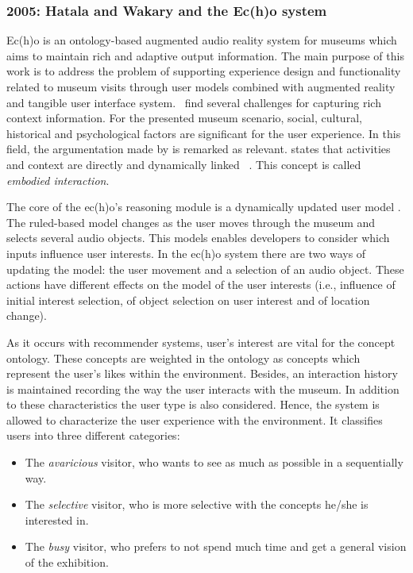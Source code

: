 \subsubsection{2005: Hatala and Wakary and the Ec(h)o system}
\label{sec:hatala}

Ec(h)o is an ontology-based augmented audio reality system for museums which 
aims to maintain rich and adaptive output information. The main purpose of this 
work is to address the problem of supporting experience design and functionality 
related to museum visits through user models combined with augmented reality 
and tangible user interface system.~\citet{hatala_ontology_based_2005} find
several challenges for capturing rich context information. For the presented 
museum scenario, social, cultural, historical and psychological factors are 
significant for the user experience. In this field, the argumentation made by
is remarked as relevant. \citeauthor{dourish_what_2004} states that activities 
and context are directly and dynamically linked \citet{dourish_what_2004}~\citep{dourish_where_2004}.
This concept is called \textit{embodied interaction}.

The core of the ec(h)o's reasoning module is a dynamically updated user model
\citep{wahlster1989user}. The ruled-based model changes as the user moves 
through the museum and selects several audio objects. This models enables 
developers to consider which inputs influence user interests. In the ec(h)o 
system there are two ways of updating the model: the user movement and a 
selection of an audio object. These actions have different effects on the model 
of the user interests (i.e., influence of initial interest selection, of object 
selection on user interest and of location change). 

As it occurs with recommender systems, user's interest are vital for the concept
ontology. These concepts are weighted in the ontology as concepts which represent
the user's likes within the environment. Besides, an interaction history is 
maintained recording the way the user interacts with the museum. In addition to 
these characteristics the user type is also considered. Hence, the system is 
allowed to characterize the user experience with the environment. It classifies 
users into three different categories:

\begin{itemize}
  \item The \textit{avaricious} visitor, who wants to see as much as possible
  in a sequentially way.
  \item The \textit{selective} visitor, who is more selective with the concepts 
  he/she is interested in.
  \item The \textit{busy} visitor, who prefers to not spend much time and get a 
  general vision of the exhibition.
\end{itemize}
